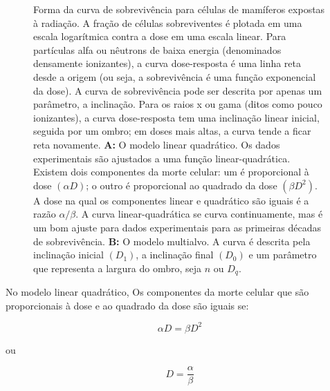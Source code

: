 \documentclass[11pt,a4paper]{article}
\begin{document}
	\begin{figure}[h]
		\centering
		\caption{Forma da curva de sobrevivência para células de mamíferos expostas à radiação. A fração de células sobreviventes é plotada em uma escala logarítmica contra a dose em uma escala linear. Para partículas alfa ou nêutrons de baixa energia (denominados densamente ionizantes), a curva dose-resposta é uma linha reta desde a origem (ou seja, a sobrevivência é uma função exponencial da dose). A curva de sobrevivência pode ser descrita por apenas um parâmetro, a inclinação. Para os raios x ou gama (ditos como pouco ionizantes), a curva dose-resposta tem uma inclinação linear inicial, seguida por um ombro; em doses mais altas, a curva tende a ficar reta novamente. \textbf{A:} O modelo linear quadrático. Os dados experimentais são ajustados a uma função linear-quadrática. Existem dois componentes da morte celular: um é proporcional à dose 
		$(\alpha D)$; o outro é proporcional ao quadrado da dose $(\beta D^2)$. A dose na qual os componentes linear e quadrático são iguais é a razão $\alpha/\beta$. A curva linear-quadrática se curva continuamente, mas é um bom ajuste para dados experimentais para as primeiras décadas de sobrevivência. \textbf{B:} O modelo multialvo. A curva é descrita pela inclinação inicial $(D_1)$, a inclinação final $(D_0)$ e um parâmetro que representa a largura do ombro, seja $n$ ou $D_q$.}
		\label{fig:fracaoSobrevivencia}
	\end{figure}

	No modelo linear quadrático, Os componentes da morte celular que são proporcionais à dose e ao quadrado da dose são iguais se:

	\begin{equation}
		\alpha D = \beta D^2
	\end{equation}

	ou

	\begin{equation}
		D = \frac{\alpha}{\beta}
	\end{equation}
\end{document}
